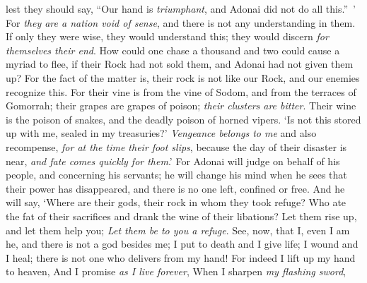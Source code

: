 \begin{biblechapter}
lest they should say,  “Our hand is 
\textit{triumphant}, and Adonai did not do all this.” ’
\verse For \textit{they are a nation void of sense}, 
and there is not any understanding in them.
\verse If only they were wise, they would understand this; 
they would discern \textit{for themselves their end}.
\verse How could one chase a thousand 
and two could cause a myriad to flee, 
if their Rock had not sold them, 
and Adonai had not given them up?
\verse For the fact of the matter is, 
their rock is not like our Rock, 
and our enemies recognize this.
\verse For their vine is from the vine of Sodom, 
and from the terraces of Gomorrah; 
their grapes are grapes of poison; 
\textit{their clusters are bitter}.
\verse Their wine is the poison of snakes, 
and the deadly poison of horned vipers.
\verse ‘Is not this stored up with me, 
sealed in my treasuries?’
\verse \textit{Vengeance belongs to me} and also recompense, 
\textit{for at the time their foot slips}, 
because the day of their disaster is near, 
\textit{and fate comes quickly for them}.’
\verse For Adonai will judge on behalf of his people, 
and concerning his servants; 
he will change his mind when he sees that their power has disappeared, 
and there is no one left, confined or free.
\verse And he will say, ‘Where are their gods, 
their rock in whom they took refuge?
\verse Who ate the fat of their sacrifices 
and drank the wine of their libations? 
Let them rise up, and let them help you; 
\textit{Let them be to you a refuge}.
\verse See, now, that I, even I am he, 
and there is not a god besides me; 
I put to death and I give life; 
I wound and I heal; 
there is not one who delivers from my hand!
\verse For indeed I lift up my hand to heaven, 
And I promise \textit{as I live forever},
\verse When I sharpen \textit{my flashing sword}, 

\end{biblechapter}
